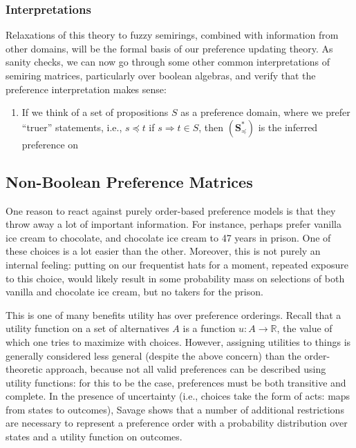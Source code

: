 \documentclass{article}
\theoremstyle{plain}
\theoremstyle{definition}
\theoremstyle{remark}
\newcommand\leqc{\preccurlyeq}
\newcommand\mat[1]{\mathbf #1}
\begin{document}
	\subsubsection{Interpretations}
	Relaxations of this theory to fuzzy semirings, combined with information from other domains, will be the formal basis of our preference updating theory. As sanity checks, we can now go through some other common interpretations of semiring matrices, particularly over boolean algebras, and verify that the preference interpretation makes sense:
	
	\begin{enumerate}[nosep]
		\item If we think of a set of propositions $S$ as a preference domain, where we prefer ``truer'' statements, i.e., $s \leqc t$ if $s \Rightarrow t \in S$, then $(\mat S_\leqc^*)$ is the inferred preference on 
	\end{enumerate}

	\subsection{Non-Boolean Preference Matrices} \label{sec:nbpref}
	One reason to react against purely order-based preference models is that they throw away a lot of important information. For instance, perhaps prefer vanilla ice cream to chocolate, and chocolate ice cream to 47 years in prison. One of these choices is a lot easier than the other. Moreover, this is not purely an internal feeling: putting on our frequentist hats for a moment, repeated exposure to this choice, would likely result in some probability mass on selections of both vanilla and chocolate ice cream, but no takers for the prison.
	
	This is one of many benefits utility has over preference orderings. Recall that a utility function on a set of alternatives $A$ is a function $u : A \to \mathbb R$, the value of which one tries to maximize with choices. 
	However, assigning utilities to things is generally considered less general (despite the above concern) than the order-theoretic approach, because not all valid preferences can be described using utility functions: for this to be the case, preferences must be both transitive and complete. In the presence of uncertainty (i.e., choices take the form of acts: maps from states to outcomes), Savage \cite{savage1972foundations} shows that a number of additional restrictions are necessary to represent a preference order with a probability distribution over states and a utility function on outcomes. 
	
\end{document}
